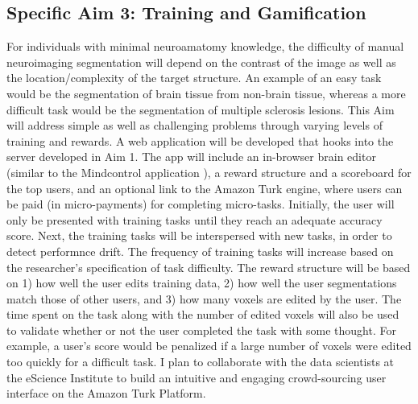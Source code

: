 

\subsection*{Specific Aim 3: Training and Gamification}

For individuals with minimal neuroamatomy knowledge, the difficulty of manual neuroimaging segmentation will depend on the contrast of the image as well as the location/complexity of the target structure. An example of an easy task would be the segmentation of brain tissue from non-brain tissue, whereas a more difficult task would be the segmentation of multiple sclerosis lesions. This Aim will address simple as well as challenging problems through varying levels of training and rewards. A web application will be developed that hooks into the server developed in Aim 1. The app will include an in-browser brain editor (similar to the Mindcontrol application \cite{keshavan2016mindcontrol}), a reward structure and a scoreboard for the top users, and an optional link to the Amazon Turk engine, where users can be paid (in micro-payments) for completing micro-tasks. Initially, the user will only be presented with training tasks until they reach an adequate accuracy score. Next, the training tasks will be interspersed with new tasks, in order to detect performnce drift. The frequency of training tasks will increase based on the researcher's specification of task difficulty. The reward structure will be based on 1) how well the user edits training data, 2) how well the user segmentations match those of other users, and 3) how many voxels are edited by the user. The time spent on the task along with the number of edited voxels will also be used to validate whether or not the user completed the task with some thought. For example, a user's score would be penalized if a large number of voxels were edited too quickly for a difficult task. I plan to collaborate with the data scientists at the eScience Institute to build an intuitive and engaging crowd-sourcing user interface on the Amazon Turk Platform.